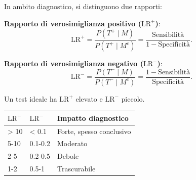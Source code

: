 \documentclass[
  italian,
  letterpaper,
  a4paper,
  11pt,
  open=any]{scrbook}
\newcounter{none} %
\theoremstyle{plain}
\theoremstyle{definition}
\theoremstyle{definition}
\theoremstyle{remark}
\begin{document}
In ambito diagnostico, si distinguono due rapporti:

\textbf{Rapporto di verosimiglianza positivo (\(\text{LR}^+\))}: \[
\text{LR}^+ = \frac{P(T^+ \mid M)}{P(T^+ \mid M^c)}
= \frac{\text{Sensibilità}}{1 - \text{Specificità}}.
\]

\textbf{Rapporto di verosimiglianza negativo (\(\text{LR}^-\))}: \[
\text{LR}^- = \frac{P(T^- \mid M)}{P(T^- \mid M^c)}
= \frac{1 - \text{Sensibilità}}{\text{Specificità}}.
\]

Un test ideale ha \(\text{LR}^+\) elevato e \(\text{LR}^-\) piccolo.

\begin{tcolorbox}[enhanced jigsaw, arc=.35mm, bottomrule=.15mm, bottomtitle=1mm, breakable, colback=white, colbacktitle=quarto-callout-tip-color!10!white, colframe=quarto-callout-tip-color-frame, coltitle=black, left=2mm, leftrule=.75mm, opacityback=0, opacitybacktitle=0.6, rightrule=.15mm, title=\textcolor{quarto-callout-tip-color}{\faLightbulb}\hspace{0.5em}{Interpretazione pratica dei rapporti di verosimiglianza}, titlerule=0mm, toprule=.15mm, toptitle=1mm]

{\def\LTcaptype{none} %
\begin{longtable}[]{@{}lll@{}}
\toprule\noalign{}
\(\text{LR}^+\) & \(\text{LR}^-\) & Impatto diagnostico \\
\midrule\noalign{}
\endhead
\bottomrule\noalign{}
\endlastfoot
\textgreater{} 10 & \textless{} 0.1 & Forte, spesso conclusivo \\
5-10 & 0.1-0.2 & Moderato \\
2-5 & 0.2-0.5 & Debole \\
1-2 & 0.5-1 & Trascurabile \\
\end{longtable}
}

\end{tcolorbox}
\end{document}
